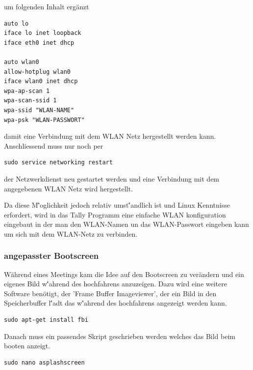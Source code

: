 \documentclass[11pt,a4paper]{article} %
\begin{document}
um folgenden Inhalt ergänzt
\begin{frame}

\begin{lstlisting}
auto lo
iface lo inet loopback
iface eth0 inet dhcp

auto wlan0
allow-hotplug wlan0
iface wlan0 inet dhcp
wpa-ap-scan 1
wpa-scan-ssid 1
wpa-ssid "WLAN-NAME"
wpa-psk "WLAN-PASSWORT"

\end{lstlisting}

\end{frame}

damit eine Verbindung mit dem WLAN Netz hergestellt werden kann.
Anschliessend muss nur noch per
\begin{frame}

\begin{lstlisting}
sudo service networking restart
\end{lstlisting}

\end{frame}
der Netzwerkdienst neu gestartet werden und eine Verbindung mit dem angegebenen WLAN Netz wird hergestellt.
\par
Da diese M\''oglichkeit jedoch relativ umst\''andlich ist und Linux Kenntnisse erfordert, wird in das Tally Programm eine einfache WLAN konfiguration eingebaut in der man den WLAN-Namen un das WLAN-Passwort eingeben kann um sich mit dem WLAN-Netz zu verbinden.

\subsubsection{angepasster Bootscreen}
Während eines Meetings kam die Idee auf den Bootscreen zu verändern und ein eigenes Bild w\''ahrend des hochfahrens anzuzeigen. Dazu wird eine weitere Software benötigt, der 'Frame Buffer Imageviewer', der ein Bild in den Speicherbuffer l\''adt das w\''ahrend des hochfahrens angezeigt werden kann.
\begin{frame}

\begin{lstlisting}
sudo apt-get install fbi
\end{lstlisting}

\end{frame}

Danach muss ein passendes Skript geschrieben werden welches das Bild beim booten anzeigt.
\begin{frame}

\begin{lstlisting}
sudo nano asplashscreen
\end{lstlisting}

\end{frame}
\end{document}
